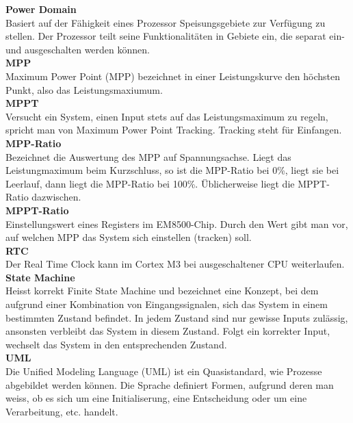 \textbf{Power Domain}\\
\forceindent Basiert auf der Fähigkeit eines Prozessor Speisungsgebiete zur Verfügung zu stellen. Der Prozessor teilt seine Funktionalitäten in Gebiete ein, die separat ein- und ausgeschalten werden können.\\

\textbf{MPP}\\
\forceindent Maximum Power Point (MPP) bezeichnet in einer Leistungskurve den höchsten Punkt, also das Leistungsmaxiumum.\\

\textbf{MPPT}\\
\forceindent Versucht ein System, einen Input stets auf das Leistungsmaximum zu regeln, spricht man von Maximum Power Point Tracking. Tracking steht für Einfangen.\\

\textbf{MPP-Ratio}\\
\forceindent Bezeichnet die Auswertung des MPP auf Spannungsachse. Liegt das Leistungmaximum beim Kurzschluss, so ist die MPP-Ratio bei 0\thinspace\%, liegt sie bei Leerlauf, dann liegt die MPP-Ratio bei 100\thinspace\%. Üblicherweise liegt die MPPT-Ratio dazwischen.\\

\textbf{MPPT-Ratio}\\
\forceindent Einstellungswert eines Registers im EM8500-Chip. Durch den Wert gibt man vor, auf welchen MPP das System sich einstellen (tracken) soll.\\

\textbf{RTC}\\
\forceindent Der Real Time Clock kann im Cortex M3 bei ausgeschaltener CPU weiterlaufen. \\ 

\textbf{State Machine}\\
\forceindent Heisst korrekt Finite State Machine und bezeichnet eine Konzept, bei dem aufgrund einer Kombination von Eingangssignalen, sich das System in einem bestimmten Zustand befindet. In jedem Zustand sind nur gewisse Inputs zulässig, ansonsten verbleibt das System in diesem Zustand. Folgt ein korrekter Input, wechselt das System in den entsprechenden Zustand. \\

\textbf{UML}\\
\forceindent Die Unified Modeling Language (UML) ist ein Quasistandard, wie Prozesse abgebildet werden können. Die Sprache definiert Formen, aufgrund deren man weiss, ob es sich um eine Initialiserung, eine Entscheidung oder um eine Verarbeitung, etc. handelt.\\


